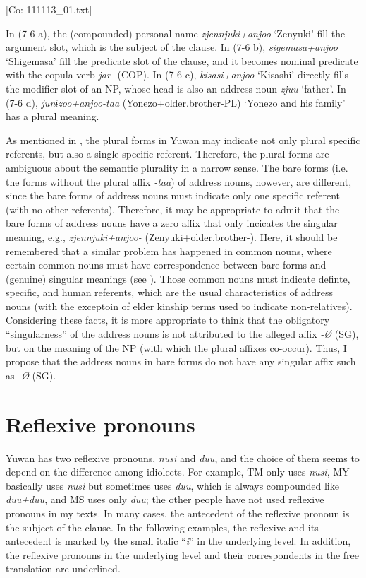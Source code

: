       [Co: 111113\_01.txt]
  \z
\z

In (7-6 a), the (compounded) personal name \textit{zjennjuki+anjoo} ‘Zenyuki’ fill the argument slot, which is the subject of the clause. In (7-6 b), \textit{sigemasa+anjoo} ‘Shigemasa’ fill the predicate slot of the clause, and it becomes nominal predicate with the copula verb \textit{jar-} (COP). In (7-6 c), \textit{kisasi+anjoo} ‘Kisashi’ directly fills the modifier slot of an NP, whose head is also an address noun \textit{zjuu} ‘father’. In (7-6 d), \textit{junɨzoo+anjoo-taa} (Yonezo+older.brother-PL) ‘Yonezo and his family’ has a plural meaning.

  As mentioned in , the plural forms in Yuwan may indicate not only plural specific referents, but also a single specific referent. Therefore, the plural forms are ambiguous about the semantic plurality in a narrow sense. The bare forms (i.e. the forms without the plural affix \textit{{}-taa}) of address nouns, however, are different, since the bare forms of address nouns must indicate only one specific referent (with no other referents). Therefore, it may be appropriate to admit that the bare forms of address nouns have a zero affix that only incicates the singular meaning, e.g., \textit{zjennjuki+anjoo-} (Zenyuki+older.brother-\textsc{}). Here, it should be remembered that a similar problem has happened in common nouns, where certain common nouns must have correspondence between bare forms and (genuine) singular meanings (see ). Those common nouns must indicate definte, specific, and human referents, which are the usual characteristics of address nouns (with the exceptoin of elder kinship terms used to indicate non-relatives). Considering these facts, it is more appropriate to think that the obligatory “singularness” of the address nouns is not attributed to the alleged affix \textit{{}-Ø} (SG), but on the meaning of the NP (with which the plural affixes co-occur). Thus, I propose that the address nouns in bare forms do not have any singular affix such as \textit{{}-Ø} (SG).

\section{Reflexive pronouns}

Yuwan has two reflexive pronouns, \textit{nusi} and \textit{duu}, and the choice of them seems to depend on the difference among idiolects. For example, TM only uses \textit{nusi}, MY basically uses \textit{nusi} but sometimes uses \textit{duu}, which is always compounded like \textit{duu+duu}, and MS uses only \textit{duu}; the other people have not used reflexive pronouns in my texts. In many cases, the antecedent of the reflexive pronoun is the subject of the clause. In the following examples, the reflexive and its antecedent is marked by the small italic “\textit{i}” in the underlying level. In addition, the reflexive pronouns in the underlying level and their correspondents in the free translation are underlined.

